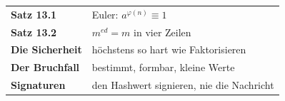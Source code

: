\begin{merksatz}
\begin{center}
\renewcommand{\arraystretch}{1.5}
\begin{tabular}{@{}P{3.0cm}P{5.6cm}@{}}
\toprule
\textbf{Satz 13.1} & Euler: $a^{\varphi(n)}\equiv1$\\
\textbf{Satz 13.2} & $m^{ed} = m$ in vier Zeilen\\
\textbf{Die Sicherheit} & höchstens so hart wie Faktorisieren\\
\textbf{Der Bruchfall} & bestimmt, formbar, kleine Werte\\
\textbf{Signaturen} & den Hashwert signieren, nie die Nachricht\\
\bottomrule
\end{tabular}
\end{center}

\begin{center}
\begin{minipage}{0.88\textwidth}
\end{minipage}
\end{center}
\end{merksatz}
